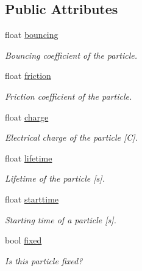 \subsection*{Public Attributes}
\begin{DoxyCompactItemize}
\item 
\mbox{\label{classphysim_1_1particles_1_1free__particle_aac766fa5294e47b944d32ca3e38d47fa}} 
float \hyperlink{classphysim_1_1particles_1_1free__particle_aac766fa5294e47b944d32ca3e38d47fa}{bouncing}
\begin{DoxyCompactList}\small\item\em Bouncing coefficient of the particle. \end{DoxyCompactList}\item 
\mbox{\label{classphysim_1_1particles_1_1free__particle_a9e7dfd81e9392fc42b3faecb57afdc02}} 
float \hyperlink{classphysim_1_1particles_1_1free__particle_a9e7dfd81e9392fc42b3faecb57afdc02}{friction}
\begin{DoxyCompactList}\small\item\em Friction coefficient of the particle. \end{DoxyCompactList}\item 
\mbox{\label{classphysim_1_1particles_1_1free__particle_a7513ac41f3cab1ce083f8695e2c73301}} 
float \hyperlink{classphysim_1_1particles_1_1free__particle_a7513ac41f3cab1ce083f8695e2c73301}{charge}
\begin{DoxyCompactList}\small\item\em Electrical charge of the particle \mbox{[}C\mbox{]}. \end{DoxyCompactList}\item 
float \hyperlink{classphysim_1_1particles_1_1free__particle_a5870d6fd3167d2c6120f887f45fe50fc}{lifetime}
\begin{DoxyCompactList}\small\item\em Lifetime of the particle \mbox{[}s\mbox{]}. \end{DoxyCompactList}\item 
float \hyperlink{classphysim_1_1particles_1_1free__particle_ad0379ba926ecc909bfbfb373045bfcf9}{starttime}
\begin{DoxyCompactList}\small\item\em Starting time of a particle \mbox{[}s\mbox{]}. \end{DoxyCompactList}\item 
bool \hyperlink{classphysim_1_1particles_1_1free__particle_a0f6d69caeac140abd74c7be4ed55eb74}{fixed}
\begin{DoxyCompactList}\small\item\em Is this particle fixed? \end{DoxyCompactList}\end{DoxyCompactItemize}
